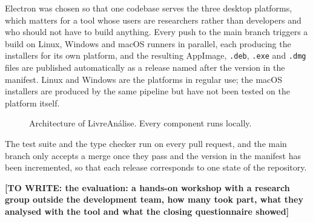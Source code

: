 \documentclass[12pt]{article}
\newcommand{\todo}[1]{\textbf{[TO WRITE: #1]}}
\begin{document}
Electron was chosen so that one codebase serves the three desktop platforms,
which matters for a tool whose users are researchers rather than developers and
who should not have to build anything. Every push to the main branch triggers a
build on Linux, Windows and macOS runners in parallel, each producing the
installers for its own platform, and the resulting AppImage, \texttt{.deb},
\texttt{.exe} and \texttt{.dmg} files are published automatically as a release
named after the version in the manifest. Linux and Windows are the platforms in
regular use; the macOS installers are produced by the same pipeline but have
not been tested on the platform itself.
\begin{figure}[ht]
\centering
{}
\caption{Architecture of LivreAn\'alise. Every component runs locally.}
\label{fig:arquitetura}
\end{figure}

The test suite and the type checker run on every pull request, and the main
branch only accepts a merge once they pass and the version in the manifest has
been incremented, so that each release corresponds to one state of the
repository.

\todo{the evaluation: a hands-on workshop with a research group outside the
development team, how many took part, what they analysed with the tool and what
the closing questionnaire showed}
\end{document}
